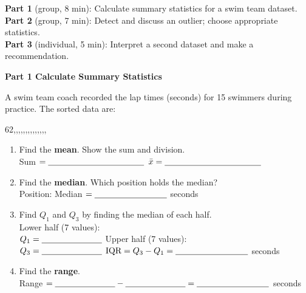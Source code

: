 \documentclass[10pt]{article}
\begin{document}
\namepartnerperiod

\vspace{0.10in}

\begin{tcolorbox}[colback=sky, colframe=navy, boxrule=0.8pt, arc=2mm,
    left=3mm, right=3mm, top=2mm, bottom=2mm]
\small
\textbf{Part 1} (group, 8 min): Calculate summary statistics for a swim team dataset.\\
\textbf{Part 2} (group, 7 min): Detect and discuss an outlier; choose appropriate statistics.\\
\textbf{Part 3} (individual, 5 min): Interpret a second dataset and make a recommendation.
\end{tcolorbox}

\vspace{0.10in}

{\large\bfseries\color{navy} Part 1 \quad Calculate Summary Statistics}

\vspace{0.10in}

\noindent\small A swim team coach recorded the lap times (seconds) for 15 swimmers
during practice. The sorted data are:

\vspace{0.08in}
\begin{center}
\small
62,,,,,,,,,,,,,,
\end{center}

\vspace{0.12in}

\begin{enumerate}[leftmargin=1.5em, itemsep=8pt]

  \item Find the \textbf{mean}. Show the sum and division.\\[5pt]
        Sum $= \blank{4cm}$ \qquad $\bar{x} = \blank{4cm}$

  \item Find the \textbf{median}. Which position holds the median?\\[5pt]
        Position: \blank{2cm} \qquad Median $= \blank{3cm}$ seconds

  \item Find $Q_1$ and $Q_3$ by finding the median of each half.\\[5pt]
        Lower half (7 values): \blank{7cm}\\[4pt]
        $Q_1 = \blank{2.5cm}$ \hfill
        Upper half (7 values): \blank{7cm}\\[4pt]
        $Q_3 = \blank{2.5cm}$ \hfill
        $\text{IQR} = Q_3 - Q_1 = \blank{3cm}$ seconds

  \item Find the \textbf{range}.\\[5pt]
        Range $= \blank{2.5cm} - \blank{2.5cm} = \blank{3cm}$ seconds

\end{enumerate}
\end{document}
